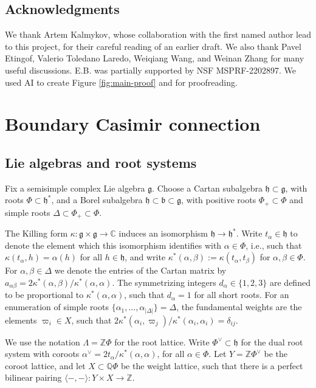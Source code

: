 \documentclass[10pt]{amsart}
\numberwithin{equation}{section}
\theoremstyle{definition}
\newcommand{\g}{\mathfrak{g}}
\newcommand{\borel}{\mathfrak{b}}
\newcommand{\h}{\mathfrak{h}}
\begin{document}
\subsection*{Acknowledgments} 
We thank Artem Kalmykov, whose collaboration with the first named author lead to this project, for their careful reading of an earlier draft. We also thank Pavel Etingof, Valerio Toledano Laredo, Weiqiang Wang, and Weinan Zhang for many useful discussions. E.B. was partially supported by NSF MSPRF-2202897. We used AI to create Figure \ref{fig:main-proof} and for proofreading. 

%
\section{Boundary Casimir connection}\label{sec2}
%
\subsection{Lie algebras and root systems}\label{sec:lietheorynotation}

Fix a semisimple complex Lie algebra $\g$. Choose a Cartan subalgebra $\h\subset \g$, with roots $\Phi \subset \h^*$, and a Borel subalgebra $\h\subset \borel\subset \g$, with positive roots $\Phi_+\subset \Phi$ and simple roots $\Delta\subset \Phi_+\subset \Phi$.

The Killing form $\kappa:\g\times \g \rightarrow \mathbb{C}$ induces an isomorphism $\h\rightarrow \h^*$. Write $t_{\alpha} \in \h$ to denote the element which this isomorphism identifies with $\alpha\in \Phi$, i.e., such that $\kappa(t_{\alpha}, h) = \alpha(h)$ for all $h\in \h$, and write $\kappa^*(\alpha,\beta) :=\kappa(t_{\alpha},t_{\beta})$ for $\alpha, \beta\in \Phi$. For $\alpha,\beta\in \Delta$ we denote the entries of the Cartan matrix by $a_{\alpha\beta}=2\kappa^*(\alpha,\beta)/\kappa^*(\alpha,\alpha)$. The symmetrizing integers $d_{\alpha}\in \{1,2,3\}$ are defined to be proportional to $\kappa^*(\alpha,\alpha)$, such that $d_{\alpha}=1$ for all short roots. For an enumeration of simple roots $\{\alpha_1, \dots, \alpha_{|\Delta|}\}=\Delta$, the fundamental weights are the elements $\varpi_i\in X$, such that $2\kappa^*(\alpha_i,\varpi_j)/\kappa^*(\alpha_i,\alpha_i)=\delta_{ij}$.

We use the notation $\Lambda=\mathbb{Z}\Phi$ for the root lattice. Write $\Phi^{\vee}\subset \h$ for the dual root system with coroots $\alpha^{\vee}=2t_{\alpha}/ \kappa^*(\alpha,\alpha)$, for all $\alpha\in \Phi$. Let $Y=\mathbb{Z}\Phi^{\vee}$ be the coroot lattice, and let $X\subset \mathbb{Q}\Phi$ be the weight lattice, such that there is a perfect bilinear pairing $\langle -,- \rangle: Y \times X \rightarrow \mathbb{Z}$. 
\end{document}
